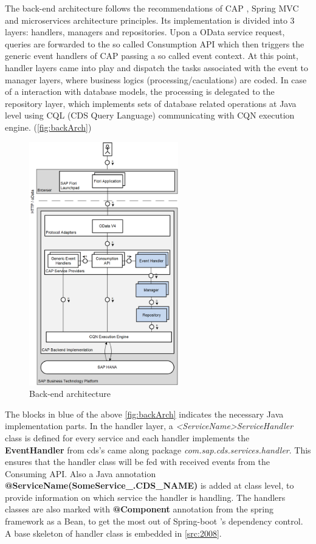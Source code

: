 The back-end architecture follows the recommendations of CAP \cite{cap-java-architecture}, Spring MVC \cite{spring-mvc} and microservices architecture principles. Its implementation is divided into 3 layers: handlers, managers and repositories. Upon a OData service request, queries are forwarded to the so called Consumption API which then triggers the generic event handlers of CAP passing a so called event context. At this point, handler layers came into play and dispatch the tasks associated with the event to manager layers, where business logics (processing/caculations) are coded. In case of a interaction with database models, the processing is delegated to the repository layer, which implements sets of database related operations at Java level using CQL (CDS Query Language) \cite{cap-cds-cql} communicating with CQN execution engine. (\autoref{fig:backArch})

\begin{figure}[H]
	\centering
	\includegraphics[height=400px]{images/backend_architecture.png}
	\caption{Back-end architecture}
	\label{fig:backArch}
\end{figure}

The blocks in blue of the above \autoref{fig:backArch} indicates the necessary Java implementation parts. 
In the handler layer, a \textit{<ServiceName>ServiceHandler} class is defined for every service and each handler implements the \textbf{EventHandler} \cite{cap-java-event-handler} from cds's came along package \textit{com.sap.cds.services.handler}. This ensures that the handler class will be fed with received events from the Consuming API. Also a Java annotation \textbf{@ServiceName(SomeService\_.CDS\_NAME)} is added at class level, to provide information on which service the handler is handling. The handlers classes are also marked with \textbf{@Component} annotation from the spring framework as a Bean, to get the most out of Spring-boot \cite{springboot-doc}'s dependency control. A base skeleton of handler class is embedded in \autoref{src:2008}.

